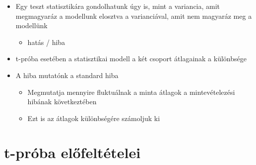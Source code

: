 \documentclass[
  letterpaper,
  DIV=11,
  numbers=noendperiod]{scrreprt}
\providecommand{\tightlist}{%
  \setlength{\itemsep}{0pt}\setlength{\parskip}{0pt}}\usepackage{longtable,booktabs,array}
\begin{document}
\begin{itemize}
\item
  Egy teszt statisztikára gondolhatunk úgy is, mint a variancia, amit
  megmagyaráz a modellunk elosztva a varianciával, amit nem magyaráz meg
  a modellünk

  \begin{itemize}
  \tightlist
  \item
    hatás / hiba
  \end{itemize}
\item
  t-próba esetében a statisztikai modell a két csoport átlagainak a
  különbsége
\item
  A hiba mutatónk a standard hiba

  \begin{itemize}
  \item
    Megmutatja mennyire fluktuálnak a minta átlagok a mintevételezési
    hibának következtében
  \item
    Ezt is az átlagok különbségére számoljuk ki
  \end{itemize}
\end{itemize}

\hypertarget{t-pruxf3ba-elux151feltuxe9telei}{%
\section{t-próba előfeltételei}\label{t-pruxf3ba-elux151feltuxe9telei}}
\end{document}
